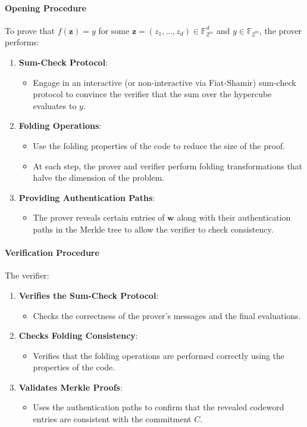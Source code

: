 \documentclass{article}
\theoremstyle{plain}
\theoremstyle{definition}
\theoremstyle{remark}
\theoremstyle{problem}
\begin{document}
\paragraph{Opening Procedure}

To prove that $f(\mathbf{z}) = y$ for some $\mathbf{z} = (z_1, \dots, z_d) \in \mathbb{F}_{2^m}^d$ and $y \in \mathbb{F}_{2^m}$, the prover performs:

\begin{enumerate}
    \item \textbf{Sum-Check Protocol}:
    \begin{itemize}
        \item Engage in an interactive (or non-interactive via Fiat-Shamir) sum-check protocol to convince the verifier that the sum over the hypercube evaluates to $y$.
    \end{itemize}
    \item \textbf{Folding Operations}:
    \begin{itemize}
        \item Use the folding properties of the code to reduce the size of the proof.
        \item At each step, the prover and verifier perform folding transformations that halve the dimension of the problem.
    \end{itemize}
    \item \textbf{Providing Authentication Paths}:
    \begin{itemize}
        \item The prover reveals certain entries of $\mathbf{w}$ along with their authentication paths in the Merkle tree to allow the verifier to check consistency.
    \end{itemize}
\end{enumerate}

\paragraph{Verification Procedure}

The verifier:

\begin{enumerate}
    \item \textbf{Verifies the Sum-Check Protocol}:
    \begin{itemize}
        \item Checks the correctness of the prover's messages and the final evaluations.
    \end{itemize}
    \item \textbf{Checks Folding Consistency}:
    \begin{itemize}
        \item Verifies that the folding operations are performed correctly using the properties of the code.
    \end{itemize}
    \item \textbf{Validates Merkle Proofs}:
    \begin{itemize}
        \item Uses the authentication paths to confirm that the revealed codeword entries are consistent with the commitment $C$.
    \end{itemize}
\end{enumerate}
\end{document}
